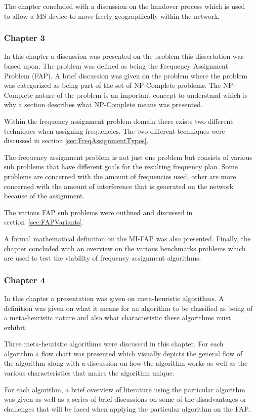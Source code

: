 The chapter concluded with a discussion on the handover process which is used to allow a MS device to move freely geographically within the network. 
\subsubsection{Chapter 3}
In this chapter a discussion was presented on the problem this dissertation was based upon. The problem was defined as being the Frequency Assignment Problem (FAP). A brief discussion was given on the problem where the problem was categorized as being part of the set of NP-Complete problems. The NP-Complete nature of the problem is an important concept to understand which is why a section describes what NP-Complete means was presented.

Within the frequency assignment problem domain there exists two different techniques when assigning frequencies. The two different techniques were discussed in section \ref{sec:FreqAssignmentTypes}. 

The frequency assignment problem is not just one problem but consists of various sub problems that have different goals for the resulting frequency plan. Some problems are concerned with the amount of frequencies used, other are more concerned with the amount of interference that is generated on the network because of the assignment.

The various FAP sub problems were outlined and discussed in section~\ref{sec:FAPVariants}.

A formal mathematical definition on the MI-FAP was also presented. Finally, the chapter concluded with an overview on the various benchmarks problems which are used to test the viability of frequency assignment algorithms.
\subsubsection{Chapter 4}
In this chapter a presentation was given on meta-heuristic algorithms. A definition was given on what it means for an algorithm to be classified as being of a meta-heuristic nature and also what characteristic these algorithms must exhibit.

Three meta-heuristic algorithms were discussed in this chapter. For each algorithm a flow chart was presented which visually depicts the general flow of the algorithm along with a discussion on how the algorithm works as well as the various characteristics that makes the algorithm unique.

For each algorithm, a brief overview of literature using the particular algorithm was given as well as a series of brief discussions on some of the disadvantages or challenges that will be faced when applying the particular algorithm on the FAP.

